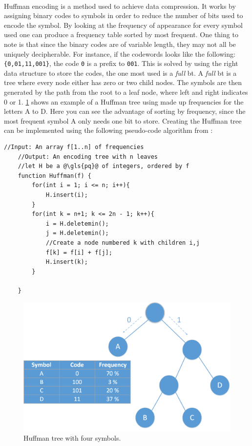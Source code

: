 \documentclass[a4paper, 12pt, openright, twoside]{report}
\newcommand{\codeword}[1]{\texttt{#1}}
\begin{document}
\paragraph{}
Huffman encoding is a method used to achieve data compression\cite{huffman}.
It works by assigning binary codes to symbols in order to reduce the number of bits used to encode the symbol.
By looking at the frequency of appearance for every symbol used one can produce a frequency table sorted by most frequent.
One thing to note is that since the binary codes are of variable length, they may not all be uniquely decipherable.
For instance, if the codewords looks like the following: \codeword{\{0,01,11,001\}}, the code \codeword{0} is a prefix to \codeword{001}.
This is solved by using the right data structure to store the codes, the one most used is a \textit{full} \gls{bt}.
A \textit{full} \gls{bt} is a tree where every node either has zero or two child nodes.
The symbols are then generated by the path from the root to a leaf node, where left and right indicates 0 or 1.
\ref{fig:hm-ex} shows an example of a Huffman tree using made up frequencies for the letters A to D.
Here you can see the advantage of sorting by frequency, since the most frequent symbol A only needs one bit to store.
Creating the Huffman tree can be implemented using the following pseudo-code algorithm from \cite{algorithms}:

\begin{lstlisting}[caption=Huffman algorithm., label=lst:huffman]
	//Input: An array f[1..n] of frequencies
	//Output: An encoding tree with n leaves
	//let H be a @\gls{pq}@ of integers, ordered by f
	function Huffman(f) {
		for(int i = 1; i <= n; i++){
			H.insert(i);
		}
		for(int k = n+1; k <= 2n - 1; k++){
			i = H.deletemin();
			j = H.deletemin();
			//Create a node numbered k with children i,j
			f[k] = f[i] + f[j];
			H.insert(k);
		}

	}
\end{lstlisting}

\begin{figure}[h!]
	\centering
		\includegraphics[width=1.0\textwidth]{images/huffman.png}
		\caption{Huffman tree with four symbols.}
		\label{fig:hm-ex}
\end{figure}
\end{document}
